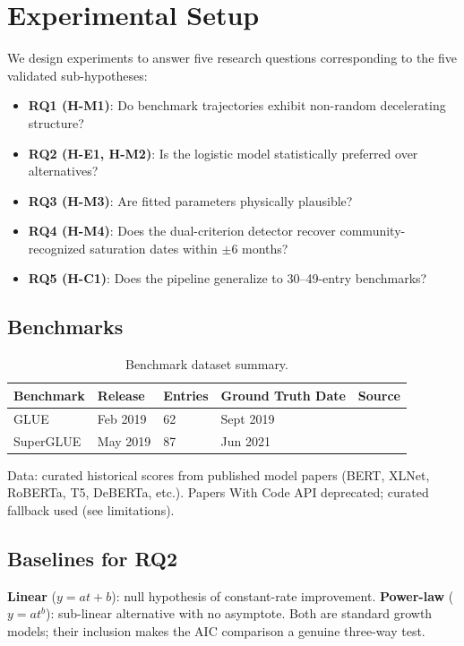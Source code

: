 \section{Experimental Setup}

We design experiments to answer five research questions corresponding to the five validated sub-hypotheses:

\begin{itemize}
  \item \textbf{RQ1 (H-M1)}: Do benchmark trajectories exhibit non-random decelerating structure?
  \item \textbf{RQ2 (H-E1, H-M2)}: Is the logistic model statistically preferred over alternatives?
  \item \textbf{RQ3 (H-M3)}: Are fitted parameters physically plausible?
  \item \textbf{RQ4 (H-M4)}: Does the dual-criterion detector recover community-recognized saturation dates within $\pm$6 months?
  \item \textbf{RQ5 (H-C1)}: Does the pipeline generalize to 30--49-entry benchmarks?
\end{itemize}

\subsection{Benchmarks}

\begin{table}[h]
\centering
\caption{Benchmark dataset summary.}
\begin{tabular}{lllll}
\toprule
Benchmark & Release & Entries & Ground Truth Date & Source \\
\midrule
GLUE & Feb 2019 & 62 & Sept 2019 & \citet{wang2019superglue} \\
SuperGLUE & May 2019 & 87 & Jun 2021 & \citet{srivastava2022bigbench} \\
\bottomrule
\end{tabular}
\end{table}

Data: curated historical scores from published model papers (BERT, XLNet, RoBERTa, T5, DeBERTa, etc.).
Papers With Code API deprecated; curated fallback used (see limitations).

\subsection{Baselines for RQ2}

\textbf{Linear} ($y = at + b$): null hypothesis of constant-rate improvement.
\textbf{Power-law} ($y = at^b$): sub-linear alternative with no asymptote.
Both are standard growth models; their inclusion makes the AIC comparison a genuine three-way test.

